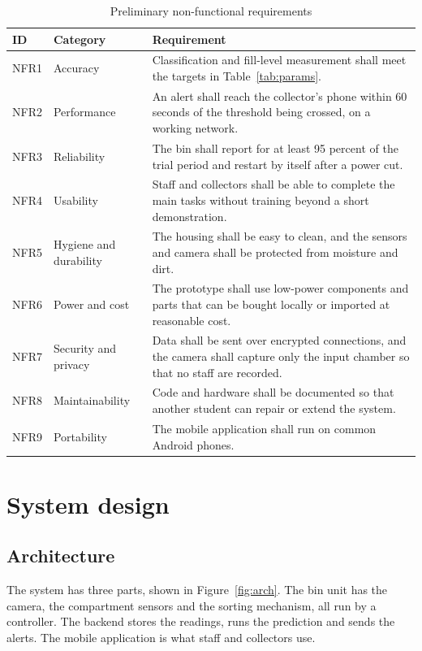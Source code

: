 \documentclass[12pt,a4paper]{report}
\begin{document}
\begin{table}[htbp]
\centering
\small
\renewcommand{\arraystretch}{1.25}
\begin{tabular}{>{\raggedright\arraybackslash}p{1.4cm}>{\raggedright\arraybackslash}p{3.0cm}>{\raggedright\arraybackslash}p{7.5cm}}
\hline
\textbf{ID} & \textbf{Category} & \textbf{Requirement}\\
\hline
NFR1 & Accuracy & Classification and fill-level measurement shall meet the targets in Table~\ref{tab:params}.\\
NFR2 & Performance & An alert shall reach the collector's phone within 60 seconds of the threshold being crossed, on a working network.\\
NFR3 & Reliability & The bin shall report for at least 95 percent of the trial period and restart by itself after a power cut.\\
NFR4 & Usability & Staff and collectors shall be able to complete the main tasks without training beyond a short demonstration.\\
NFR5 & Hygiene and durability & The housing shall be easy to clean, and the sensors and camera shall be protected from moisture and dirt.\\
NFR6 & Power and cost & The prototype shall use low-power components and parts that can be bought locally or imported at reasonable cost.\\
NFR7 & Security and privacy & Data shall be sent over encrypted connections, and the camera shall capture only the input chamber so that no staff are recorded.\\
NFR8 & Maintainability & Code and hardware shall be documented so that another student can repair or extend the system.\\
NFR9 & Portability & The mobile application shall run on common Android phones.\\
\hline
\end{tabular}
\caption{Preliminary non-functional requirements}
\label{tab:nfr}
\end{table}

\section{System design}

\subsection{Architecture}

The system has three parts, shown in Figure~\ref{fig:arch}. The bin unit has the camera, the compartment sensors and the sorting mechanism, all run by a controller. The backend stores the readings, runs the prediction and sends the alerts. The mobile application is what staff and collectors use.
\end{document}
